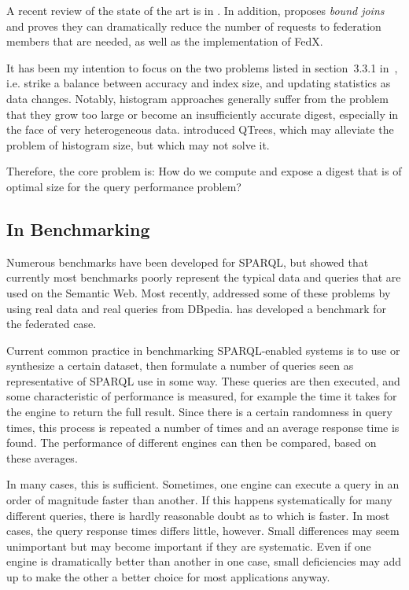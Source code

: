 \documentclass{llncs}
\begin{document}
A recent review of the state of the art is in
\cite{springerlink:10.1007/978-3-642-17551-0-5}. In addition,
\cite{springerlink:10.1007/978-3-642-25073-6-38} proposes
\emph{bound joins} and proves they can dramatically reduce the number of
requests to federation members that are needed, as well as the implementation of
FedX.

It has been my intention to focus on the two problems listed in
section~3.3.1
in~\cite{springerlink:10.1007/978-3-642-17551-0-5}, i.e. strike a
balance between accuracy and index size, and updating statistics as
data changes. Notably, histogram
approaches generally suffer from the problem that they grow too large
or become an insufficiently accurate digest, especially in the face of
very heterogeneous data.  \cite{Harth:2010:DSO:1772690.1772733}
introduced QTrees, which may alleviate the problem of histogram size,
but which may not solve it.

Therefore, the core problem is: How do we compute and expose a digest that
is of optimal size for the query performance problem?

\subsection{In Benchmarking}

Numerous benchmarks have been developed for SPARQL, but
\cite{Duan:2011:AOC:1989323.1989340} showed that currently most
benchmarks poorly represent the typical data and queries that are used
on the Semantic Web.
Most recently, \cite{mxro:Morsey2011DBpedia} addressed some of these
problems by using real data and real queries from
DBpedia. \cite{Schmidt:2011:FBS:2063016.2063054} has developed a
benchmark for the federated case.

Current common practice in benchmarking SPARQL-enabled systems is to
use or synthesize a certain dataset, then formulate a number of
queries seen as representative of SPARQL use in some way. These
queries are then executed, and some characteristic of performance is
measured, for example the time it takes for the engine to return the
full result. Since there is a certain randomness in query times, this
process is repeated a number of times and an average response time is
found. The performance of different engines can then be compared,
based on these averages.

In many cases, this is sufficient. Sometimes, one engine can execute a
query in an order of magnitude faster than another. If this happens
systematically for many different queries, there is hardly reasonable
doubt as to which is faster. In most cases, the query response times
differs little, however. Small differences may seem unimportant
but may become important if they are systematic. Even if one engine is
dramatically better than another in one case, small deficiencies may
add up to make the other a better choice for most applications anyway.
\end{document}
